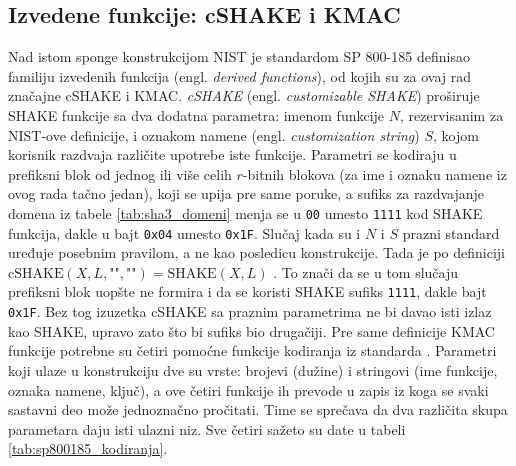 \subsection{Izvedene funkcije: cSHAKE i KMAC}
\label{subsec:kmac}

Nad istom sponge konstrukcijom NIST je standardom SP 800-185 \cite{sp800185} definisao familiju izvedenih funkcija (engl. \textit{derived functions}), od kojih su za ovaj rad značajne cSHAKE i KMAC.
\smallbreak
\textit{cSHAKE} (engl. \textit{customizable SHAKE}) proširuje SHAKE funkcije sa dva dodatna parametra: imenom funkcije $N$, rezervisanim za NIST-ove definicije, i oznakom namene (engl. \textit{customization string}) $S$, kojom korisnik razdvaja različite upotrebe iste funkcije. Parametri se kodiraju u prefiksni blok od jednog ili više celih $r$-bitnih blokova (za ime i oznaku namene iz ovog rada tačno jedan), koji se upija pre same poruke, a sufiks za razdvajanje domena iz tabele \ref{tab:sha3_domeni} menja se u \texttt{00} umesto \texttt{1111} kod SHAKE funkcija, dakle u bajt \texttt{0x04} umesto \texttt{0x1F}.
\smallbreak
Slučaj kada su i $N$ i $S$ prazni standard uređuje posebnim pravilom, a ne kao posledicu konstrukcije. Tada je po definiciji $\mathrm{cSHAKE}(X, L, \texttt{""}, \texttt{""}) = \mathrm{SHAKE}(X, L)$ \cite{sp800185}. To znači da se u tom slučaju prefiksni blok uopšte ne formira i da se koristi SHAKE sufiks \texttt{1111}, dakle bajt \texttt{0x1F}. Bez tog izuzetka cSHAKE sa praznim parametrima ne bi davao isti izlaz kao SHAKE, upravo zato što bi sufiks bio drugačiji.
\smallbreak
Pre same definicije KMAC funkcije potrebne su četiri pomoćne funkcije kodiranja iz standarda \cite{sp800185}. Parametri koji ulaze u konstrukciju dve su vrste: brojevi (dužine) i stringovi (ime funkcije, oznaka namene, ključ), a ove četiri funkcije ih prevode u zapis iz koga se svaki sastavni deo može jednoznačno pročitati. Time se sprečava da dva različita skupa parametara daju isti ulazni niz. Sve četiri sažeto su date u tabeli \ref{tab:sp800185_kodiranja}.

